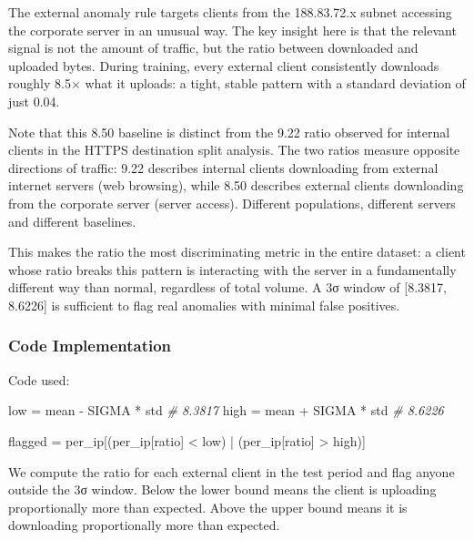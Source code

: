 \documentclass[
  11pt,
]{article}
\newenvironment{Shaded}{\vspace{4pt}}{\vspace{4pt}}
\newcommand{\CommentTok}[1]{\textcolor[rgb]{0.38,0.63,0.69}{\textit{#1}}}
\newcommand{\NormalTok}[1]{#1}
\newcommand{\OperatorTok}[1]{\textcolor[rgb]{0.40,0.40,0.40}{#1}}
\newcommand{\StringTok}[1]{\textcolor[rgb]{0.25,0.44,0.63}{#1}}
\begin{document}
The external anomaly rule targets clients from the 188.83.72.x subnet
accessing the corporate server in an unusual way. The key insight here
is that the relevant signal is not the amount of traffic, but the ratio
between downloaded and uploaded bytes. During training, every external
client consistently downloads roughly 8.5× what it uploads: a tight,
stable pattern with a standard deviation of just 0.04.

Note that this 8.50 baseline is distinct from the 9.22 ratio observed
for internal clients in the HTTPS destination split analysis. The two
ratios measure opposite directions of traffic: 9.22 describes internal
clients downloading from external internet servers (web browsing),
while 8.50 describes external clients downloading from the corporate
server (server access). Different populations, different servers and
different baselines.

This makes the ratio the most discriminating metric in the entire
dataset: a client whose ratio breaks this pattern is interacting with
the server in a fundamentally different way than normal, regardless of
total volume. A 3σ window of {[}8.3817, 8.6226{]} is sufficient to flag
real anomalies with minimal false positives.

\subsubsection{Code Implementation}


Code used:

\begin{Shaded}
\begin{Highlighting}[]
\NormalTok{low }\OperatorTok{=}\NormalTok{ mean }\OperatorTok{{-}}\NormalTok{ SIGMA }\OperatorTok{*}\NormalTok{ std  }\CommentTok{\# 8.3817}
\NormalTok{high }\OperatorTok{=}\NormalTok{ mean }\OperatorTok{+}\NormalTok{ SIGMA }\OperatorTok{*}\NormalTok{ std }\CommentTok{\# 8.6226}

\NormalTok{flagged }\OperatorTok{=}\NormalTok{ per\_ip[(per\_ip[}\StringTok{\textquotesingle{}ratio\textquotesingle{}}\NormalTok{] }\OperatorTok{\textless{}}\NormalTok{ low) }\OperatorTok{|}\NormalTok{ (per\_ip[}\StringTok{\textquotesingle{}ratio\textquotesingle{}}\NormalTok{] }\OperatorTok{\textgreater{}}\NormalTok{ high)]}
\end{Highlighting}
\end{Shaded}

We compute the ratio for each external client in the test period and
flag anyone outside the 3σ window. Below the lower bound means the
client is uploading proportionally more than expected. Above the upper
bound means it is downloading proportionally more than expected.
\end{document}
